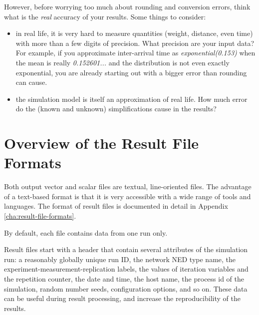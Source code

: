 However, before worrying too much about rounding and conversion errors,
think what is the \textit{real} accuracy of your results.
Some things to consider:

\begin{itemize}
  \item{in real life, it is very hard to measure quantities (weight, distance,
     even time) with more than a few digits of precision. What precision
     are your input data? For example, if you approximate inter-arrival
     time as \textit{exponential(0.153)} when the mean is really
     \textit{0.152601...} and the distribution is not even exactly exponential,
     you are already starting out with a bigger error than rounding can cause.}

  \item{the simulation model is itself an approximation of real life. How much
     error do the (known and unknown) simplifications cause in the results?}
\end{itemize}



\section{Overview of the Result File Formats}

Both output vector and scalar files are textual, line-oriented files.
The advantage of a text-based format is that it is very accessible
with a wide range of tools and languages. The format of result files is
documented in detail in Appendix \ref{cha:result-file-formats}.


By default, each file contains data from one run only.

Result files start with a header that contain several attributes of the
simulation run: a reasonably globally unique run ID, the network NED type
name, the experiment-measurement-replication labels, the values of
iteration variables and the repetition counter, the date and time, the host
name, the process id of the simulation, random number seeds, configuration
options, and so on. These data can be useful during result processing, and
increase the reproducibility of the results.

